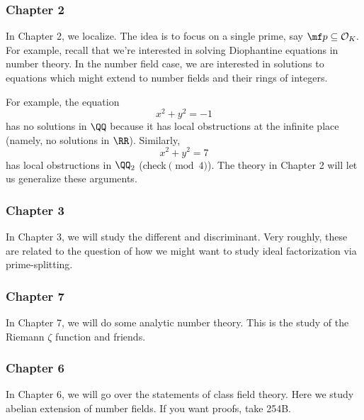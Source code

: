 \documentclass[../notes.tex]{subfiles}
\begin{document}
\subsubsection{Chapter 2}
In Chapter 2, we localize. The idea is to focus on a single prime, say $\mf p\subseteq\mathcal O_K.$ For example, recall that we're interested in solving Diophantine equations in number theory. In the number field case, we are interested in solutions to equations which might extend to number fields and their rings of integers.

For example, the equation
\[x^2+y^2=-1\]
has no solutions in $\QQ$ because it has local obstructions at the infinite place (namely, no solutions in $\RR$). Similarly,
\[x^2+y^2=7\]
has local obstructions in $\QQ_2$ (check$\pmod4$). The theory in Chapter 2 will let us generalize these arguments.

\subsubsection{Chapter 3}
In Chapter 3, we will study the different and discriminant. Very roughly, these are related to the question of how we might want to study ideal factorization via prime-splitting.

\subsubsection{Chapter 7}
In Chapter 7, we will do some analytic number theory. This is the study of the Riemann $\zeta$ function and friends.

\subsubsection{Chapter 6}
In Chapter 6, we will go over the statements of class field theory. Here we study abelian extension of number fields. If you want proofs, take 254B.
\end{document}
